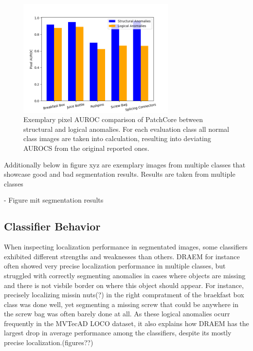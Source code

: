 \begin{figure}[H]
    \centering
    \includegraphics[width=0.7\textwidth]{figures/structvslogic.png}
    \caption{Exemplary pixel AUROC comparison of PatchCore \cite{patchCore2022} between structural and logical anomalies. For each evaluation class all normal class images 
             are taken into calculation, resulting into deviating AUROCS from the original reported ones.}
    \label{fig:structvslogic}
\end{figure}

Additionally below in figure xyz are exemplary images from multiple classes that showcase good and bad segmentation results. Results are taken from multiple classes 

- Figure mit segmentation results


\subsection{Classifier Behavior}
\label{subsec:classifierbehavior}

When inspecting localization performance in segmentated images, some classifiers exhibited different strengths and weaknesses than others. 
DRAEM \cite{Zavrtanik_2021DRAEM} for instance often showed very precise localization performance in multiple classes, but struggled 
with correctly segmenting anomalies in cases where objects are missing and there is not visbile border on where this object should 
appear. For instance, precisely localizing missin nuts(?) in the right compratment of the braekfast box class was done well, yet 
segmenting a missing screw that could be anywhere in the screw bag was often barely done at all. As these logical anomalies ocurr 
frequently in the MVTecAD LOCO \cite{LOCODentsAndScratchesBergmann2022} dataset, it also explains how DRAEM 
has the largest drop in average performance among the classifiers, despite its mostly precise localization.(figures??)

